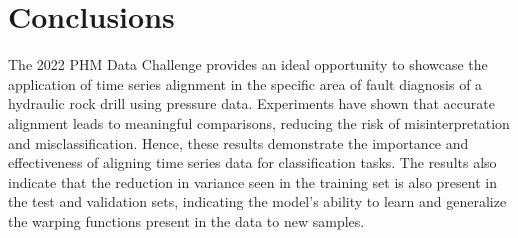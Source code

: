 
\clearpage
\section{Conclusions}\label{sec:conclusions_4}

The 2022 PHM Data Challenge provides an ideal opportunity to showcase the application of time series alignment in the specific area of fault diagnosis of a hydraulic rock drill using pressure data. 
Experiments have shown that accurate alignment leads to meaningful comparisons, reducing the risk of misinterpretation and misclassification. Hence, these results demonstrate the importance and effectiveness of aligning time series data for classification tasks. 
The results also indicate that the reduction in variance seen in the training set is also present in the test and validation sets, indicating the model's ability to learn and generalize the warping functions present in the data to new samples. 


